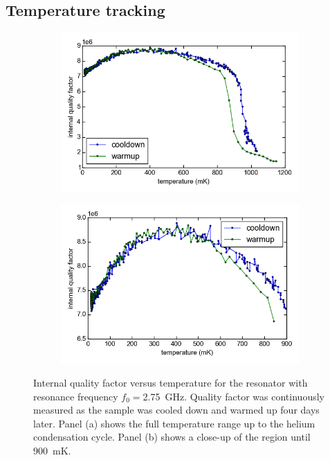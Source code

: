 \documentclass[12pt]{report}
\newcommand{\figureinset}[3]{\llap{\parbox[b]{#2in}{#1\\\rule{0ex}{#3in}}}}
\begin{document}
\subsection{Temperature tracking}
\label{resonator:results:temperature_tracking}
\begin{figure}[h]
    \centering
    \begin{subfigure}[b]{.49\textwidth}
        \label{fig:temperature_tracking_Qi_drop}
        \includegraphics[width=\textwidth]{Figures/Temperature tracking drop - Qi vs T.png}\figureinset{(a)}{2.65}{1.92}
    \end{subfigure}
    \begin{subfigure}[b]{.49\textwidth}
        \label{fig:temperature_tracking_Qi_nodrop}
        \includegraphics[width=\textwidth]{Figures/Temperature tracking - no drop - Qi vs T.png}\figureinset{(b)}{2.57}{1.92}
    \end{subfigure}
    \caption{Internal quality factor versus temperature for the resonator with resonance frequency $f_0= $\SI{2.75}{\giga \hertz}. Quality factor was continuously measured as the sample was cooled down and warmed up four days later. Panel (a) shows the full temperature range up to the helium condensation cycle. Panel (b) shows a close-up of the region until \SI{900}{\milli \kelvin}.}
    \label{fig:temperature_tracking_Qi}
\end{figure}
\end{document}
